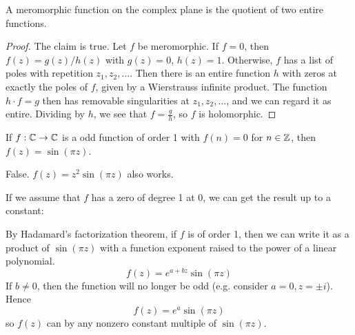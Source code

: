 \documentclass{homework}
\begin{document}
                                    \begin{problem}
                                      A meromorphic function on the complex plane is the quotient of two
                                        entire functions.
                                        \end{problem}
                                        \begin{proof}
                                        The claim is true. Let $f$ be meromorphic. If $f=0$, then $f(z)=g(z)/h(z)$ with $g(z)=0$, $h(z)=1$. Otherwise, $f$ has a list of poles with repetition $z_1, z_2, \dots$. Then there is an entire function $h$ with zeros at exactly the poles of $f$, given by a Wierstrauss infinite product. The function $h\cdot f = g$ then has removable singularities at $z_1, z_2, \dots$, and we can regard it as entire. Dividing by $h$, we see that $f = \frac{g}{h}$, so $f$ is holomorphic.
                                        \end{proof}
                                        \begin{problem}
                                          If $f : \mathbb{C} \to \mathbb{C}$ is a odd function of order 1 with $f(n) = 0$ for
                                            $n \in \mathbb{Z}$, then $f(z) = \sin (\pi z)$.
                                            \end{problem}
                                            \begin{solution}
                                            False. $f(z) = z^2\sin (\pi z)$ also works.


                                            If we assume that $f$ has a zero of degree 1 at 0, we can get the result up to a constant:

                                            By Hadamard's factorization theorem, if $f$ is of order 1, then we can write it as a product of $\sin(\pi z)$ with a function exponent raised to the power of a linear polynomial.
                                            \[
                                            f(z) = e^{a+bz}\sin(\pi z)
                                            \]
                                            If $b\neq 0$, then the function will no longer be odd (e.g. consider $a=0, z=\pm i$). Hence 
                                            \[
                                            f(z) = e^{a}\sin(\pi z)
                                            \]
                                            so $f(z)$ can by any nonzero constant multiple of $\sin(\pi z)$.
                                            \end{solution}
                                            
\end{document}

